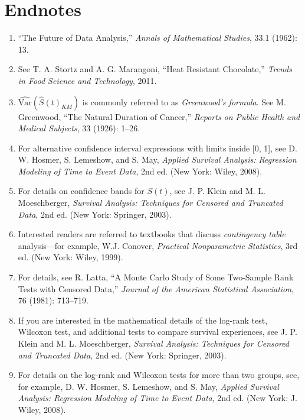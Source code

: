 \documentclass[
]{report}
\begin{document}
\section*{\texorpdfstring{\textbf{Endnotes}}{Endnotes}}\label{endnotes-2}

\begin{enumerate}

\item “The Future of Data Analysis,” \textit{Annals of Mathematical Studies}, 33.1 (1962): 13.
\item See T. A. Stortz and A. G. Marangoni, “Heat Resistant Chocolate,” \textit{Trends in Food Science and Technology}, 2011.
\item $\widehat{\text{Var}}(\widehat{S}(t)_{KM})$ is commonly referred to as \textit{Greenwood’s formula}. See M. Greenwood, “The Natural Duration of Cancer,” \textit{Reports on Public Health and Medical Subjects}, 33 (1926): 1–26.
\item For alternative confidence interval expressions with limits inside [0, 1], see D. W. Hosmer, S. Lemeshow, and S. May, \textit{Applied Survival Analysis: Regression Modeling of Time to Event Data}, 2nd ed. (New York: Wiley, 2008).
\item For details on confidence bands for $S(t)$, see J. P. Klein and M. L. Moeschberger, \textit{Survival Analysis: Techniques for Censored and Truncated Data}, 2nd ed. (New York: Springer, 2003).
\item Interested readers are referred to textbooks that discuss \textit{contingency table} analysis—for example, W.J. Conover, \textit{Practical Nonparametric Statistics}, 3rd ed. (New York: Wiley, 1999).
\item For details, see R. Latta, “A Monte Carlo Study of Some Two-Sample Rank Tests with Censored Data,” \textit{Journal of the American Statistical Association}, 76 (1981): 713–719.
\item If you are interested in the mathematical details of the log-rank test, Wilcoxon test, and additional tests to compare survival experiences, see J. P. Klein and M. L. Moeschberger, \textit{Survival Analysis: Techniques for Censored and Truncated Data}, 2nd ed. (New York: Springer, 2003).
\item For details on the log-rank and Wilcoxon tests for more than two groups, see, for example, D. W. Hosmer, S. Lemeshow, and S. May, \textit{Applied Survival Analysis: Regression Modeling of Time to Event Data}, 2nd ed. (New York: J. Wiley, 2008).

\end{enumerate}
\end{document}
